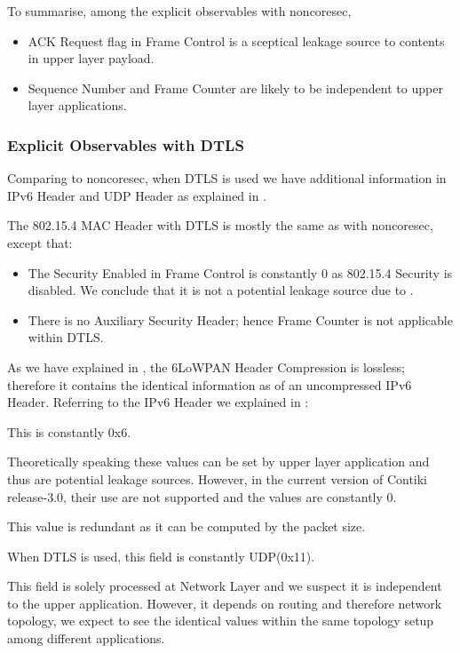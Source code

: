 To summarise, among the explicit observables with noncoresec,

\begin{itemize}
	\item ACK Request flag in Frame Control is a sceptical leakage source to contents in upper layer payload.
	\item Sequence Number and Frame Counter are likely to be independent to upper layer applications.
\end{itemize}

\subsubsection{Explicit Observables with DTLS}

Comparing to noncoresec, when DTLS is used we have additional information in IPv6 Header and UDP Header as explained in .

The 802.15.4  MAC Header with DTLS is mostly the same as with noncoresec, except that:

\begin{itemize}
	\item The Security Enabled in Frame Control is constantly $0$ as 802.15.4 Security is disabled. We conclude that it is not a potential leakage source due to .
	\item There is no Auxiliary Security Header; hence Frame Counter is not applicable within DTLS.
\end{itemize}

As we have explained in , the 6LoWPAN Header Compression is lossless; therefore it contains the identical information as of an uncompressed IPv6 Header. Referring to the IPv6 Header we explained in :

\begin{description}[style=nextline]
	\item[Version]
	This is constantly 0x6.
	\item[Traffic Class and Flow Label]
	Theoretically speaking these values can be set by upper layer application and thus are potential leakage sources. However, in the current version of Contiki release-3.0, their use are not supported and the values are constantly $0$.
	\item[Payload Length]
	This value is redundant as it can be computed by the packet size.
	\item[Next Header]
	When DTLS is used, this field is constantly UDP(0x11).
	\item[Hop Limit]
	This field is solely processed at Network Layer and we suspect it is independent to the upper application. However, it depends on routing and therefore network topology, we expect to see the identical values within the same topology setup among different applications.
\end{description}

